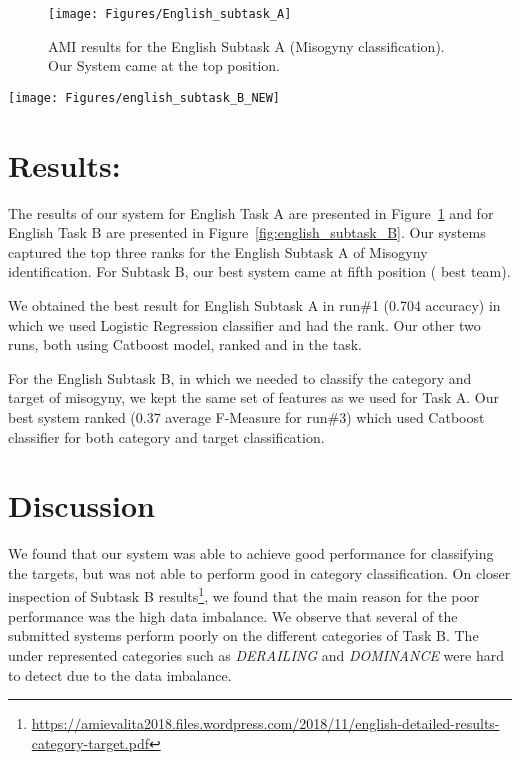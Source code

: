 \documentclass[11pt]{article}
\begin{document}
\begin{figure}[!t]
	\centering
	\texttt{[image: Figures/English\_subtask\_A]}
	\caption{AMI results for the English Subtask A (Misogyny classification). Our System came at the top position.}
	\label{fig:english_subtask_A}
\end{figure}

\begin{figure*}[h!]
	\centering
	\texttt{[image: Figures/english\_subtask\_B\_NEW]}
	\caption{AMI results for the English Subtask B (Category and target classification). Out best system came at 5 position (3 best team).}
	\label{fig:english_subtask_B}
\end{figure*}
\section{Results: }

The results of our system for English Task A are presented in Figure~\ref{fig:english_subtask_A} and for English Task B are presented in Figure~\ref{fig:english_subtask_B}. Our systems captured the top three ranks for the English Subtask A of Misogyny identification. For Subtask B, our best system came at fifth position ( best team).


We obtained the best result for English Subtask A in run\#1 (0.704 accuracy) in which we used Logistic Regression classifier and had the  rank. Our other two runs, both using Catboost model, ranked  and  in the task.

For the English Subtask B, in which we needed to classify the category and target of misogyny, we kept the same set of features as we used for Task A. Our best system ranked  (0.37 average F-Measure for run\#3) which used Catboost classifier for both category and target classification.













\section{Discussion}

We found that our system was able to achieve good performance for classifying the targets, but was not able to perform good in category classification. On closer inspection of Subtask B results\footnote{\url{https://amievalita2018.files.wordpress.com/2018/11/english-detailed-results-category-target.pdf}}, we found that the main reason for the poor performance was the high data imbalance. We observe that several of the submitted systems perform poorly on the different categories of Task B. The under represented categories such as \textit{DERAILING} and \textit{DOMINANCE} were hard to detect due to the data imbalance.
\end{document}
